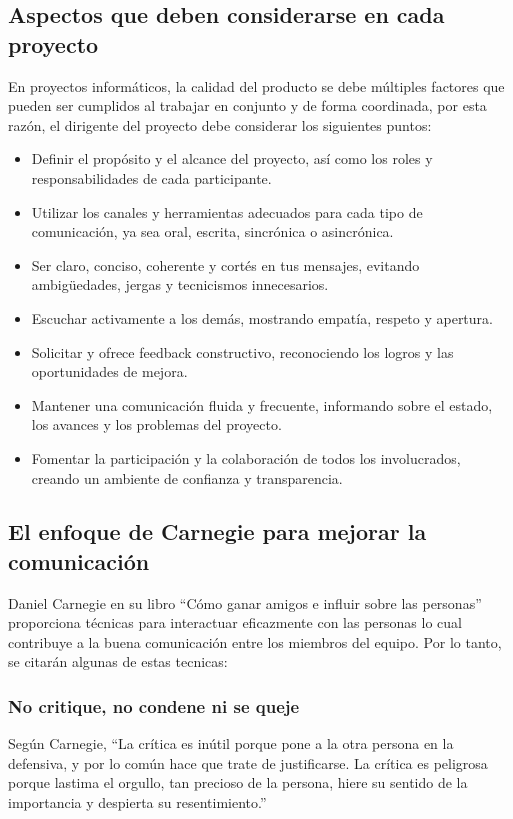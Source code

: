 \documentclass[journal]{IEEEtran}
\begin{document}
\subsection{Aspectos que deben considerarse en cada proyecto}
En proyectos informáticos, la calidad del producto se debe múltiples factores que pueden ser cumplidos al trabajar en conjunto y de forma coordinada, por esta razón, el dirigente del proyecto debe considerar los siguientes puntos:
\begin{itemize}
	\item Definir el propósito y el alcance del proyecto, así como los roles y responsabilidades de cada participante.
	\item Utilizar los canales y herramientas adecuados para cada tipo de comunicación, ya sea oral, escrita, sincrónica o asincrónica.
	\item Ser claro, conciso, coherente y cortés en tus mensajes, evitando ambigüedades, jergas y tecnicismos innecesarios.
	\item Escuchar activamente a los demás, mostrando empatía, respeto y apertura.
	\item Solicitar y ofrece feedback constructivo, reconociendo los logros y las oportunidades de mejora.
	\item Mantener una comunicación fluida y frecuente, informando sobre el estado, los avances y los problemas del proyecto.
	\item Fomentar la participación y la colaboración de todos los involucrados, creando un ambiente de confianza y transparencia.
\end{itemize}

\subsection{El enfoque de Carnegie para mejorar la comunicación}
Daniel Carnegie en su libro “Cómo ganar amigos e influir sobre las personas” proporciona técnicas para interactuar eficazmente con las personas lo cual contribuye a la buena comunicación entre los miembros del equipo. Por lo tanto, se citarán algunas de estas tecnicas:

\subsubsection{No critique, no condene ni se queje}
Según Carnegie, “La crítica es inútil porque pone a la otra persona en la defensiva, y por lo común hace que trate de justificarse. La crítica es peligrosa porque lastima el orgullo, tan precioso de la persona, hiere su sentido de la importancia y despierta su resentimiento.”
\end{document}
